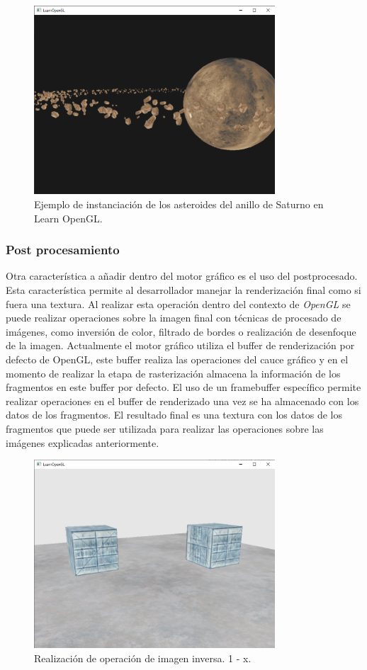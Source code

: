 \documentclass[a4paper]{book}
\begin{document}
\begin{figure}[H]
    \centering
    \includegraphics[width=9cm, keepaspectratio]{img/instanciacint_asteroids.png}
    \caption{Ejemplo de instanciación de los asteroides del anillo de Saturno en Learn OpenGL.}
    \label{instanciacint_asteroids}
\end{figure}

\subsubsection{Post procesamiento}

Otra característica a añadir dentro del motor gráfico es el uso del postprocesado. Esta característica permite
al desarrollador manejar la renderización final como si fuera una textura. Al realizar esta operación dentro del
contexto de \textit{OpenGL} se puede realizar operaciones sobre la imagen final con técnicas de procesado de imágenes, como
inversión de color, filtrado de bordes o realización de desenfoque de la imagen. Actualmente el motor gráfico utiliza
el buffer de renderización por defecto de OpenGL, este buffer realiza las operaciones del cauce gráfico y en el
momento de realizar la etapa de rasterización almacena la información de los fragmentos en este buffer por defecto.
El uso de un framebuffer específico permite realizar operaciones en el buffer de renderizado una vez se ha almacenado
con los datos de los fragmentos. El resultado final es una textura con los datos de los fragmentos que puede ser utilizada
para realizar las operaciones sobre las imágenes explicadas anteriormente.

\begin{figure}[H]
    \centering
    \includegraphics[width=9cm, keepaspectratio]{img/framebuffers_inverse.png}
    \caption{Realización de operación de imagen inversa. 1 - x.}
    \label{framebuffers_inverse}
\end{figure}
\end{document}
